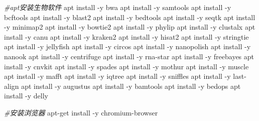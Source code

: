 \documentclass[
  10pt,
]{book}
\newenvironment{Shaded}{\begin{snugshade}}{\end{snugshade}}
\newcommand{\CommentTok}[1]{\textcolor[rgb]{0.56,0.35,0.01}{\textit{#1}}}
\newcommand{\NormalTok}[1]{#1}
\newcommand{\SpecialCharTok}[1]{\textcolor[rgb]{0.00,0.00,0.00}{#1}}
\begin{document}
\begin{Shaded}
\begin{Highlighting}[]
\CommentTok{\#apt安装生物软件}
\NormalTok{apt install }\SpecialCharTok{{-}}\NormalTok{y bwa}
\NormalTok{apt install }\SpecialCharTok{{-}}\NormalTok{y samtools }
\NormalTok{apt install }\SpecialCharTok{{-}}\NormalTok{y bcftools}
\NormalTok{apt install }\SpecialCharTok{{-}}\NormalTok{y blast2}
\NormalTok{apt install }\SpecialCharTok{{-}}\NormalTok{y bedtools}
\NormalTok{apt install }\SpecialCharTok{{-}}\NormalTok{y seqtk}
\NormalTok{apt install }\SpecialCharTok{{-}}\NormalTok{y minimap2}
\NormalTok{apt install }\SpecialCharTok{{-}}\NormalTok{y bowtie2}
\NormalTok{apt install }\SpecialCharTok{{-}}\NormalTok{y phylip}
\NormalTok{apt install }\SpecialCharTok{{-}}\NormalTok{y clustalx}
\NormalTok{apt install }\SpecialCharTok{{-}}\NormalTok{y canu}
\NormalTok{apt install }\SpecialCharTok{{-}}\NormalTok{y kraken2}
\NormalTok{apt install }\SpecialCharTok{{-}}\NormalTok{y hisat2}
\NormalTok{apt install }\SpecialCharTok{{-}}\NormalTok{y stringtie}
\NormalTok{apt install }\SpecialCharTok{{-}}\NormalTok{y jellyfish}
\NormalTok{apt install }\SpecialCharTok{{-}}\NormalTok{y circos}
\NormalTok{apt install }\SpecialCharTok{{-}}\NormalTok{y nanopolish}
\NormalTok{apt install }\SpecialCharTok{{-}}\NormalTok{y nanook}
\NormalTok{apt install }\SpecialCharTok{{-}}\NormalTok{y centrifuge}
\NormalTok{apt install }\SpecialCharTok{{-}}\NormalTok{y rna}\SpecialCharTok{{-}}\NormalTok{star}
\NormalTok{apt install }\SpecialCharTok{{-}}\NormalTok{y freebayes}
\NormalTok{apt install }\SpecialCharTok{{-}}\NormalTok{y cnvkit}
\NormalTok{apt install }\SpecialCharTok{{-}}\NormalTok{y spades}
\NormalTok{apt install }\SpecialCharTok{{-}}\NormalTok{y mothur}
\NormalTok{apt install }\SpecialCharTok{{-}}\NormalTok{y muscle}
\NormalTok{apt install }\SpecialCharTok{{-}}\NormalTok{y mafft}
\NormalTok{apt install }\SpecialCharTok{{-}}\NormalTok{y iqtree}
\NormalTok{apt install }\SpecialCharTok{{-}}\NormalTok{y sniffles}
\NormalTok{apt install }\SpecialCharTok{{-}}\NormalTok{y last}\SpecialCharTok{{-}}\NormalTok{align}
\NormalTok{apt install }\SpecialCharTok{{-}}\NormalTok{y augustus}
\NormalTok{apt install }\SpecialCharTok{{-}}\NormalTok{y bamtools }
\NormalTok{apt install }\SpecialCharTok{{-}}\NormalTok{y bedops}
\NormalTok{apt install }\SpecialCharTok{{-}}\NormalTok{y delly}

\CommentTok{\#安装浏览器}
\NormalTok{apt}\SpecialCharTok{{-}}\NormalTok{get install }\SpecialCharTok{{-}}\NormalTok{y chromium}\SpecialCharTok{{-}}\NormalTok{browser}


\end{Highlighting}
\end{Shaded}
\end{document}

